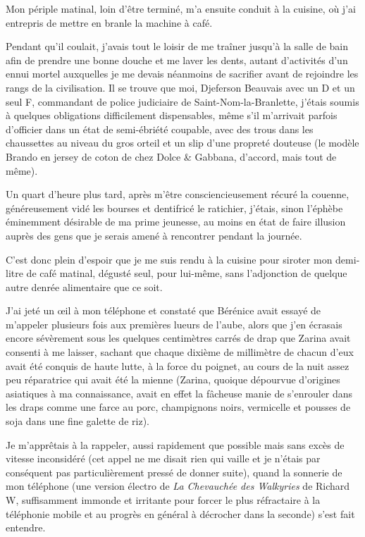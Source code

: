 Mon périple matinal, loin d’être terminé, m’a ensuite conduit à la cuisine, où j’ai entrepris de mettre en branle la machine à café.

Pendant qu’il coulait, j’avais tout le loisir de me traîner jusqu’à la salle de bain afin de prendre une bonne douche et me laver les dents, autant d’activités d’un ennui mortel auxquelles je me devais néanmoins de sacrifier avant de rejoindre les rangs de la civilisation. Il se trouve que moi, Djeferson Beauvais avec un D et un seul F, commandant de police judiciaire de Saint-Nom-la-Branlette, j’étais soumis à quelques obligations difficilement dispensables, même s’il m’arrivait parfois d’officier dans un état de semi-ébriété coupable, avec des trous dans les chaussettes au niveau du gros orteil et un slip d’une propreté douteuse (le modèle Brando en jersey de coton de chez Dolce \& Gabbana, d’accord, mais tout de même).

Un quart d’heure plus tard, après m’être consciencieusement récuré la couenne, généreusement vidé les bourses et dentifricé le ratichier, j’étais, sinon l’éphèbe éminemment désirable de ma prime jeunesse, au moins en état de faire illusion auprès des gens que je serais amené à rencontrer pendant la journée.

C’est donc plein d’espoir que je me suis rendu à la cuisine pour siroter mon demi-litre de café matinal, dégusté seul, pour lui-même, sans l’adjonction de quelque autre denrée alimentaire que ce soit.

J’ai jeté un œil à mon téléphone et constaté que Bérénice avait essayé de m’appeler plusieurs fois aux premières lueurs de l’aube, alors que j’en écrasais encore sévèrement sous les quelques centimètres carrés de drap que Zarina avait consenti à me laisser, sachant que chaque dixième de millimètre de chacun d’eux avait été conquis de haute lutte, à la force du poignet, au cours de la nuit assez peu réparatrice qui avait été la mienne (Zarina, quoique dépourvue d’origines asiatiques à ma connaissance, avait en effet la fâcheuse manie de s’enrouler dans les draps comme une farce au porc, champignons noirs, vermicelle et pousses de soja dans une fine galette de riz).

Je m’apprêtais à la rappeler, aussi rapidement que possible mais sans excès de vitesse inconsidéré (cet appel ne me disait rien qui vaille et je n’étais par conséquent pas particulièrement pressé de donner suite), quand la sonnerie de mon téléphone (une version électro de \textit{La Chevauchée des Walkyries} de Richard W, suffisamment immonde et irritante pour forcer le plus réfractaire à la téléphonie mobile et au progrès en général à décrocher dans la seconde) s’est fait entendre.

